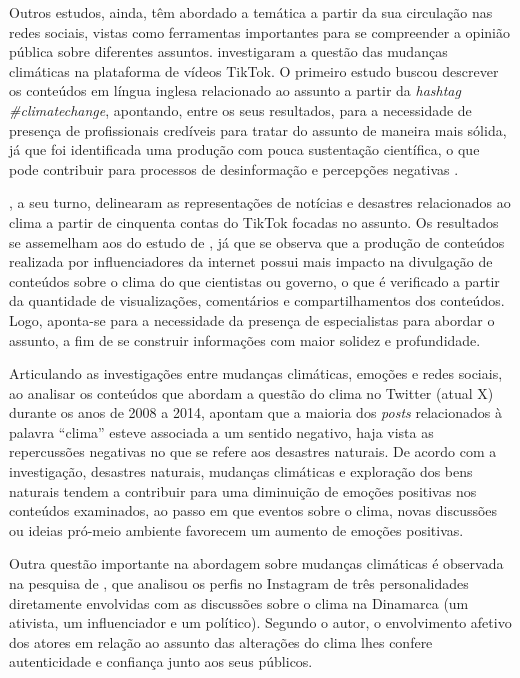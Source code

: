 \documentclass[portuguese]{textolivre}
\begin{document}
Outros estudos, ainda, têm abordado a temática a partir da sua circulação nas redes sociais, vistas como ferramentas importantes para se compreender a opinião pública sobre diferentes assuntos. \textcite{basch2021tiktok,sun2024tiktok} investigaram a questão das mudanças climáticas na plataforma de vídeos TikTok. O primeiro estudo buscou descrever os conteúdos em língua inglesa relacionado ao assunto a partir da \textit{hashtag} \textit{\#climatechange}, apontando, entre os seus resultados, para a necessidade de presença de profissionais credíveis para tratar do assunto de maneira mais sólida, já que foi identificada uma produção com pouca sustentação científica, o que pode contribuir para processos de desinformação e percepções negativas \cite{basch2021tiktok}.

\textcite{sun2024tiktok}, a seu turno, delinearam as representações de notícias e desastres relacionados ao clima a partir de cinquenta contas do TikTok focadas no assunto. Os resultados se assemelham aos do estudo de \textcite{basch2021tiktok}, já que se observa que a produção de conteúdos realizada por influenciadores da internet possui mais impacto na divulgação de conteúdos sobre o clima do que cientistas ou governo, o que é verificado a partir da quantidade de visualizações, comentários e compartilhamentos dos conteúdos. Logo, aponta-se para a necessidade da presença de especialistas para abordar o assunto, a fim de se construir informações com maior solidez e profundidade.

Articulando as investigações entre mudanças climáticas, emoções e redes sociais, ao analisar os conteúdos que abordam a questão do clima no Twitter (atual X) durante os anos de 2008 a 2014, \textcite{cody2015climate} apontam que a maioria dos \textit{posts} relacionados à palavra “clima” esteve associada a um sentido negativo, haja vista as repercussões negativas no que se refere aos desastres naturais. De acordo com a investigação, desastres naturais, mudanças climáticas e exploração dos bens naturais tendem a contribuir para uma diminuição de emoções positivas nos conteúdos examinados, ao passo em que eventos sobre o clima, novas discussões ou ideias pró-meio ambiente favorecem um aumento de emoções positivas.

Outra questão importante na abordagem sobre mudanças climáticas é observada na pesquisa de \textcite{haastrup2022personalising}, que analisou os perfis no Instagram de três personalidades diretamente envolvidas com as discussões sobre o clima na Dinamarca (um ativista, um influenciador e um político). Segundo o autor, o envolvimento afetivo dos atores em relação ao assunto das alterações do clima lhes confere autenticidade e confiança junto aos seus públicos.
\end{document}

